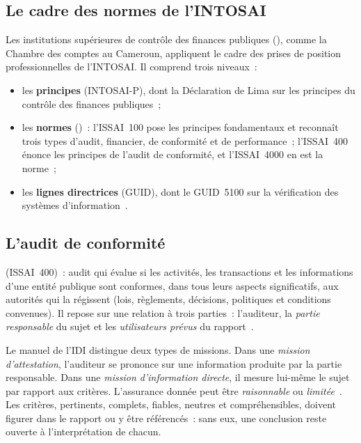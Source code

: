 
\subsection{Le cadre des normes de l'INTOSAI}

Les institutions supérieures de contrôle des finances publiques
(), comme la Chambre des comptes au Cameroun, appliquent le cadre
des prises de position professionnelles de l'INTOSAI. Il comprend trois
niveaux~:
\begin{itemize}
    \item les \textbf{principes} (INTOSAI-P), dont la Déclaration de Lima
          sur les principes du contrôle des finances publiques~;
    \item les \textbf{normes} ()~: l'ISSAI~100 pose les
          principes fondamentaux et reconnaît trois types d'audit, financier,
          de conformité et de performance~; l'ISSAI~400 énonce les principes
          de l'audit de conformité, et l'ISSAI~4000 en est la norme~;
    \item les \textbf{lignes directrices} (GUID), dont le GUID~5100 sur la
          vérification des systèmes d'information~\cite{intosai2019guid5100}.
\end{itemize}

\subsection{L'audit de conformité}

\begin{boxdef}
 (ISSAI~400)~:
audit qui évalue si les activités, les transactions et les informations
d'une entité publique sont conformes, dans tous leurs aspects
significatifs, aux autorités qui la régissent (lois, règlements,
décisions, politiques et conditions convenues). Il repose sur une relation
à trois parties~: l'auditeur, la \emph{partie responsable} du sujet et les
\emph{utilisateurs prévus} du rapport~\cite{idi2021conformite}.
\end{boxdef}

Le manuel de l'IDI distingue deux types de missions. Dans une \emph{mission
d'attestation}, l'auditeur se prononce sur une information produite par la
partie responsable. Dans une \emph{mission d'information directe}, il
mesure lui-même le sujet par rapport aux critères. L'assurance donnée peut
être \emph{raisonnable} ou \emph{limitée}~\cite{idi2021conformite}. Les
critères, pertinents, complets, fiables, neutres et compréhensibles, doivent
figurer dans le rapport ou y être référencés~: sans eux, une conclusion
reste ouverte à l'interprétation de chacun.

